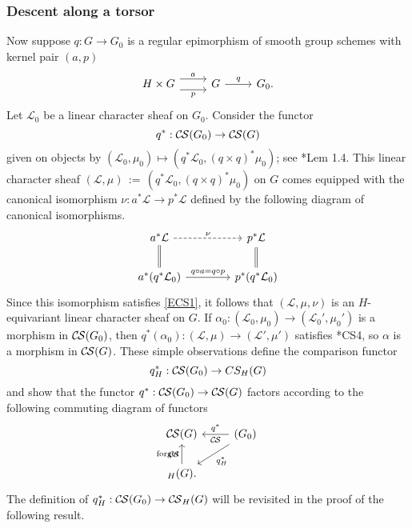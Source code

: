 \documentclass[10pt]{amsart}
\theoremstyle{plain}
\theoremstyle{definition}
\newcommand{\ceq}{{\, :=\, }}
\newcommand{\cs}[1]{{\mathcal{#1}}}
\newcommand{\CS}{{\mathcal{C\hskip-0.8pt S}}}
\begin{document}
\subsubsection{Descent along a torsor}\label{ssec:descent}

Now suppose $q : G \to G_0$ is a regular epimorphism of smooth group schemes with kernel pair $(a,p)$
\[
\begin{tikzcd}
H\times G
 \arrow[shift left=2]{r}{a}
  \arrow[shift right=2,swap]{r}{p}
&
G 
\arrow{r}{q}
& 
G_0.
\end{tikzcd}
\]
Let $\cs{L}_0$ be a linear character sheaf on $G_0$.
Consider the functor
\[
q^* : \CS(G_0) \to \CS(G)
\]
given on objects by $(\cs{L}_0,\mu_0) \mapsto (q^*\cs{L}_0, (q\times q)^* \mu_0)$; see \cite{cunningham-roe:13a}*{Lem 1.4}.
This linear character sheaf $(\cs{L},\mu)\ceq (q^*\cs{L}_0, (q\times q)^* \mu_0)$ on $G$ comes equipped with the canonical isomorphism $\nu : a^* \cs{L} \to p^* \cs{L}$ defined by the following diagram of canonical isomorphisms.
\[
\begin{tikzcd}[column sep=40]
a^*\cs{L} \arrow[equal]{d} \arrow[dashed]{r}{\nu} &  \arrow[equal]{d} p^*\cs{L} \\
a^* ( q^*\cs{L}_0) \arrow{r}{q\circ a = q\circ p}
& p^* (q^*\cs{L}_0)
\end{tikzcd}
\]
Since this isomorphism satisfies \eqref{ECS1}, it follows that $(\cs{L}, \mu,\nu)$ is an $H$-equivariant linear character sheaf on $G$.
If $\alpha_0 : (\cs{L}_0,\mu_0) \to (\cs{L}_0',\mu_0')$ is a morphism in $\CS(G_0)$, 
then $q^*(\alpha_0) : (\cs{L},\mu) \to (\cs{L}',\mu')$ satisfies \cite{cunningham-roe:13a}*{CS4}, so $\alpha$ is a morphism in $\CS(G)$.
These simple observations define the comparison functor
\[
q_H^* : \CS(G_0) \to CS_H(G)
\]
and show that the functor $q^* : \CS(G_0) \to \CS(G)$ factors according to the following commuting diagram of functors
\begin{equation}\label{qH}
\begin{tikzcd}
\CS(G) &\arrow{l}[swap]{q^*} 
\CS(G_0) \arrow{dl}{q_H^*}\\
\arrow{u}{\text{forget}} \CS_{H}(G). & 
\end{tikzcd}
\end{equation}
The definition of $q_H^* : \CS(G_0)\to \CS_H(G)$ will be revisited in the proof of the following result.
\end{document}
